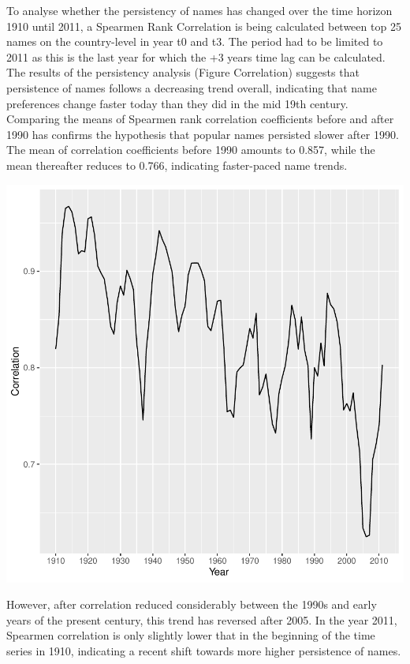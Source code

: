 \documentclass[11pt,preprint]{elsarticle}
\let\origfigure\figure
\let\endorigfigure\endfigure
\renewenvironment{figure}[1][2] {
    \expandafter\origfigure\expandafter[H]
} {
    \endorigfigure
}
\numberwithin{equation}{section}
\numberwithin{figure}{section}
\numberwithin{table}{section}
\begin{document}
To analyse whether the persistency of names has changed over the time
horizon 1910 until 2011, a Spearmen Rank Correlation is being calculated
between top 25 names on the country-level in year t0 and t3. The period
had to be limited to 2011 as this is the last year for which the +3
years time lag can be calculated. The results of the persistency
analysis (Figure Correlation) suggests that persistence of names follows
a decreasing trend overall, indicating that name preferences change
faster today than they did in the mid 19th century. Comparing the means
of Spearmen rank correlation coefficients before and after 1990 has
confirms the hypothesis that popular names persisted slower after 1990.
The mean of correlation coefficients before 1990 amounts to 0.857, while
the mean thereafter reduces to 0.766, indicating faster-paced name
trends.

\begin{figure}[H]

{\centering \includegraphics{Task_1_ReadMe_files/figure-latex/fig-correlation-1} 

}

\caption{Correlation Trend Over Time (1910–2011)}\label{fig:fig-correlation}
\end{figure}

However, after correlation reduced considerably between the 1990s and
early years of the present century, this trend has reversed after 2005.
In the year 2011, Spearmen correlation is only slightly lower that in
the beginning of the time series in 1910, indicating a recent shift
towards more higher persistence of names.
\end{document}
